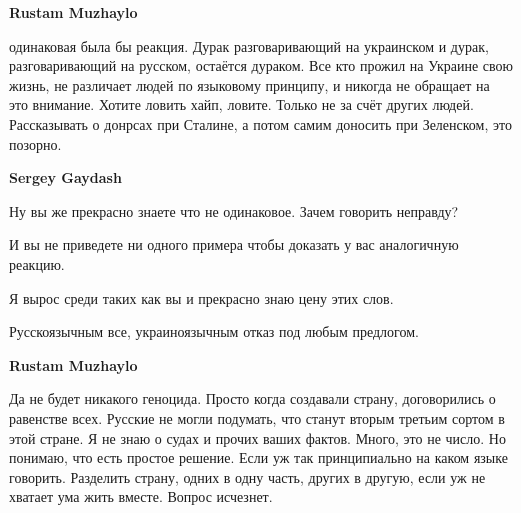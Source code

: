 \begin{itemize}
\begin{itemize}
 
\textbf{Rustam Muzhaylo} 

одинаковая была бы реакция. Дурак разговаривающий на украинском и дурак,
разговаривающий на русском, остаётся дураком. Все кто прожил на Украине свою
жизнь, не различает людей по языковому принципу, и никогда не обращает на это
внимание. Хотите ловить хайп, ловите. Только не за счёт других людей.
Рассказывать о донрсах при Сталине, а потом самим доносить при Зеленском, это
позорно.

 
\textbf{Sergey Gaydash}

Ну вы же прекрасно знаете что не одинаковое. Зачем говорить неправду?

И вы не приведете ни одного примера чтобы доказать у вас аналогичную реакцию.

Я вырос среди таких как вы и прекрасно знаю цену этих слов.

Русскоязычным все, украиноязычным отказ под любым предлогом.

 
\textbf{Rustam Muzhaylo} 

Да не будет никакого геноцида. Просто когда создавали страну, договорились о
равенстве всех. Русские не могли подумать, что станут вторым третьим сортом в
этой стране. Я не знаю о судах и прочих ваших фактов.  Много, это не число. Но
понимаю, что есть простое решение. Если уж так принципиально на каком языке
говорить. Разделить страну, одних в одну часть, других в другую, если уж не
хватает ума жить вместе. Вопрос исчезнет.


 

\end{itemize}
\end{itemize}
